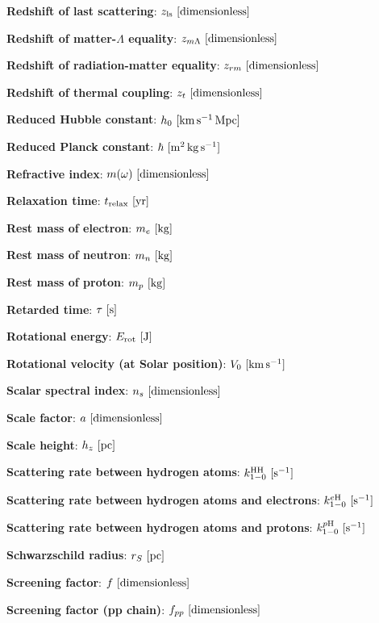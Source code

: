 \documentclass[a4paper,10pt]{article}
\begin{document}
{\noindent}\textbf{Redshift of last scattering}: $z_\mathrm{ls} ~ [{\rm dimensionless}]$

{\noindent}\textbf{Redshift of matter-$\Lambda$ equality}: $z_{m\Lambda} ~ [{\rm dimensionless}]$

{\noindent}\textbf{Redshift of radiation-matter equality}: $z_{rm} ~ [{\rm dimensionless}]$

{\noindent}\textbf{Redshift of thermal coupling}: $z_t ~ [{\rm dimensionless}]$

{\noindent}\textbf{Reduced Hubble constant}: $h_0 ~ [{\rm km\,s^{-1}\,Mpc}]$

{\noindent}\textbf{Reduced Planck constant}: $\hbar ~ [{\rm m^2\,kg\,s^{-1}}]$

{\noindent}\textbf{Refractive index}: $m(\omega) ~ [{\rm dimensionless}]$

{\noindent}\textbf{Relaxation time}: $t_\mathrm{relax} ~ [{\rm yr}]$

{\noindent}\textbf{Rest mass of electron}: $m_e ~ [{\rm kg}]$

{\noindent}\textbf{Rest mass of neutron}: $m_n ~ [{\rm kg}]$

{\noindent}\textbf{Rest mass of proton}: $m_p ~ [{\rm kg}]$

{\noindent}\textbf{Retarded time}: $\tau ~ [{\rm s}]$

{\noindent}\textbf{Rotational energy}: $E_{\rm rot} ~ [{\rm J}]$

{\noindent}\textbf{Rotational velocity (at Solar position)}: $V_0 ~ [{\rm km\,s^{-1}}]$

{\noindent}\textbf{Scalar spectral index}: $n_s ~ [{\rm dimensionless}]$

{\noindent}\textbf{Scale factor}: $a ~ [{\rm dimensionless}]$

{\noindent}\textbf{Scale height}: $h_z ~ [{\rm pc}]$

{\noindent}\textbf{Scattering rate between hydrogen atoms}: $k_{1-0}^\mathrm{HH} ~ [{\rm s^{-1}}]$

{\noindent}\textbf{Scattering rate between hydrogen atoms and electrons}: $k_{1-0}^{e\mathrm{H}} ~ [{\rm s^{-1}}]$

{\noindent}\textbf{Scattering rate between hydrogen atoms and protons}: $k_{1-0}^{p\mathrm{H}} ~ [{\rm s^{-1}}]$

{\noindent}\textbf{Schwarzschild radius}: $r_S ~ [{\rm pc}]$

{\noindent}\textbf{Screening factor}: $f ~ [{\rm dimensionless}]$

{\noindent}\textbf{Screening factor (pp chain)}: $f_{pp} ~ [{\rm dimensionless}]$
\end{document}
